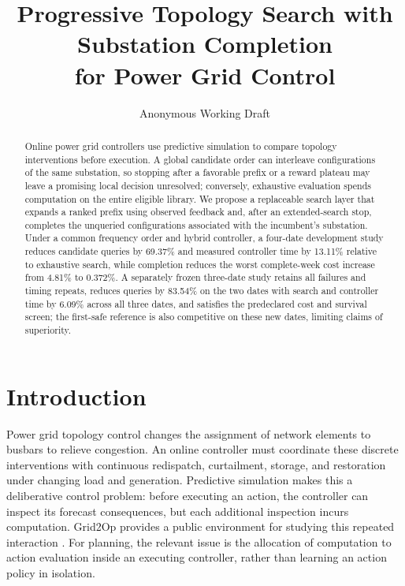 \documentclass[letterpaper]{article}
\title{Progressive Topology Search with Substation Completion\\for Power Grid Control}
\author{Anonymous Working Draft}
\begin{document}
\maketitle

\begin{abstract}
Online power grid controllers use predictive simulation to compare topology interventions before execution. A global candidate order can interleave configurations of the same substation, so stopping after a favorable prefix or a reward plateau may leave a promising local decision unresolved; conversely, exhaustive evaluation spends computation on the entire eligible library. We propose a replaceable search layer that expands a ranked prefix using observed feedback and, after an extended-search stop, completes the unqueried configurations associated with the incumbent's substation. Under a common frequency order and hybrid controller, a four-date development study reduces candidate queries by 69.37\% and measured controller time by 13.11\% relative to exhaustive search, while completion reduces the worst complete-week cost increase from 4.81\% to 0.372\%. A separately frozen three-date study retains all failures and timing repeats, reduces queries by 83.54\% on the two dates with search and controller time by 6.09\% across all three dates, and satisfies the predeclared cost and survival screen; the first-safe reference is also competitive on these new dates, limiting claims of superiority.
\end{abstract}
\section{Introduction}

Power grid topology control changes the assignment of network elements to busbars to relieve congestion. An online controller must coordinate these discrete interventions with continuous redispatch, curtailment, storage, and restoration under changing load and generation. Predictive simulation makes this a deliberative control problem: before executing an action, the controller can inspect its forecast consequences, but each additional inspection incurs computation. Grid2Op provides a public environment for studying this repeated interaction \citep{grid2op}. For planning, the relevant issue is the allocation of computation to action evaluation inside an executing controller, rather than learning an action policy in isolation.
\end{document}
